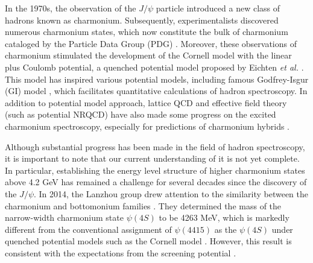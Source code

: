 \documentclass[final,5p,times,twocolumn]{elsarticle}
\begin{document}
In the 1970s, the observation of the $J/\psi$ particle \cite{E598:1974sol,SLAC-SP-017:1974ind} introduced a new class of hadrons known as charmonium. Subsequently, experimentalists discovered numerous charmonium states, which now constitute the bulk of charmonium cataloged by the Particle Data Group (PDG) \cite{ParticleDataGroup:2020ssz}. Moreover, these observations of charmonium stimulated the development of the Cornell model with the linear plus Coulomb potential, a quenched potential model proposed by Eichten {\it et al.} \cite{Eichten:1974af,Eichten:1978tg}. This model has inspired various potential models, including  famous Godfrey-Isgur (GI) model \cite{Godfrey:1985xj}, which facilitates quantitative calculations of hadron spectroscopy. { In addition to potential model approach, lattice QCD and effective field theory (such as potential NRQCD) have also made some progress on the excited charmonium spectroscopy, especially for predictions of charmonium hybrids \cite{Bali:2000gf,Ehmann:2007hj,Bali:2011rd,HadronSpectrum:2012gic,Cheung:2016bym,Lang:2015sba,Chen:2016ejo,Berwein:2015vca,Brambilla:1999xf}. }

Although substantial progress has been made in the field of hadron spectroscopy, it is important to note that our current understanding of it is not yet complete. In particular, establishing the energy level structure of higher charmonium states above 4.2 GeV has remained a challenge for several decades since the discovery of the $J/\psi$.
In 2014, the Lanzhou group drew attention to the similarity between the charmonium and bottomonium families \cite{He:2014xna}. They determined the mass of the narrow-width charmonium state $\psi(4S)$ to be 4263 MeV, which is markedly different from the conventional assignment of $\psi(4415)$ as the $\psi(4S)$ under quenched potential models such as the Cornell model \cite{Eichten:1974af,Eichten:1978tg}. However, this result is consistent with the expectations from the screening potential \cite{Dong:1994zj,Li:2009zu}.
\end{document}
